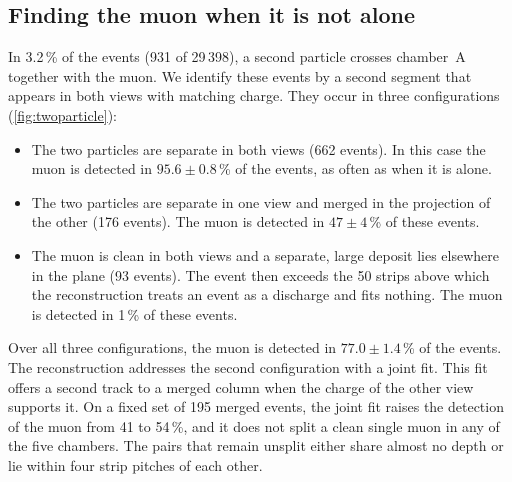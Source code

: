\subsection{Finding the muon when it is not alone}\label{sec:twoeff}
In 3.2\,\% of the events (931 of 29\,398), a second particle crosses chamber~A together with the muon. We identify
these events by a second segment that appears in both views with matching charge. They occur in three configurations
(\cref{fig:twoparticle}):
\begin{itemize}
  \item The two particles are separate in both views (662 events). In this case the muon is detected in
  $95.6\pm0.8$\,\% of the events, as often as when it is alone.
  \item The two particles are separate in one view and merged in the projection of the other (176 events). The muon is
  detected in $47\pm4$\,\% of these events.
  \item The muon is clean in both views and a separate, large deposit lies elsewhere in the plane (93 events). The
  event then exceeds the 50 strips above which the reconstruction treats an event as a discharge and fits nothing. The
  muon is detected in 1\,\% of these events.
\end{itemize}
Over all three configurations, the muon is detected in $77.0\pm1.4$\,\% of the events. The reconstruction addresses
the second configuration with a joint fit. This fit offers a second track to a merged column when the charge of the
other view supports it. On a fixed set of 195 merged events, the joint fit raises the detection of the muon from 41 to
54\,\%, and it does not split a clean single muon in any of the five chambers. The pairs that remain unsplit either
share almost no depth or lie within four strip pitches of each other.

